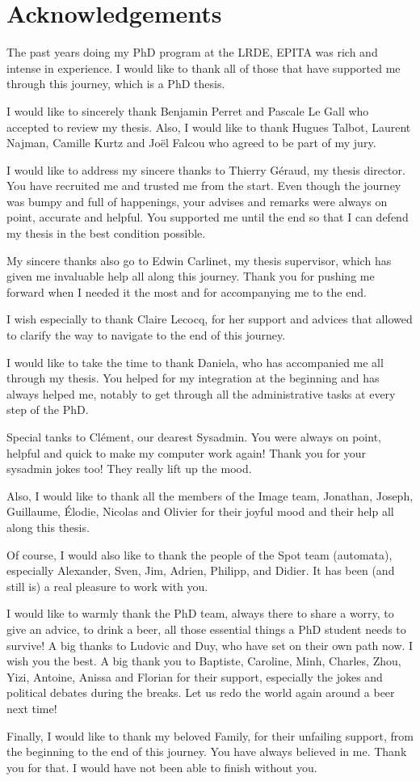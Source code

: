 \section*{Acknowledgements}
\label{sec:acknowledgement}

The past years doing my PhD program at the LRDE, EPITA was rich and intense in experience. I would like to thank all of
those that have supported me through this journey, which is a PhD thesis.

I would like to sincerely thank Benjamin Perret and Pascale Le Gall who accepted to review my thesis. Also, I would like
to thank Hugues Talbot, Laurent Najman, Camille Kurtz and Jo\"{e}l Falcou who agreed to be part of my jury.

I would like to address my sincere thanks to Thierry G\'{e}raud, my thesis director. You have recruited me and trusted
me from the start. Even though the journey was bumpy and full of happenings, your advises and remarks were always on
point, accurate and helpful. You supported me until the end so that I can defend my thesis in the best condition
possible.

My sincere thanks also go to Edwin Carlinet, my thesis supervisor, which has given me invaluable help all along this
journey. Thank you for pushing me forward when I needed it the most and for accompanying me to the end.

I wish especially to thank Claire Lecocq, for her support and advices that allowed to clarify the way to navigate to the
end of this journey.

I would like to take the time to thank Daniela, who has accompanied me all through my thesis. You helped for my
integration at the beginning and has always helped me, notably to get through all the administrative tasks at every step
of the PhD.

Special tanks to Cl\'{e}ment, our dearest Sysadmin. You were always on point, helpful and quick to make my computer work
again! Thank you for your sysadmin jokes too! They really lift up the mood.

Also, I would like to thank all the members of the Image team, Jonathan, Joseph, Guillaume, \'{E}lodie, Nicolas and
Olivier for their joyful mood and their help all along this thesis.

Of course, I would also like to thank the people of the Spot team (automata), especially Alexander, Sven, Jim, Adrien,
Philipp, and Didier. It has been (and still is) a real pleasure to work with you.

I would like to warmly thank the PhD team, always there to share a worry, to give an advice, to drink a beer, all those
essential things a PhD student needs to survive! A big thanks to Ludovic and Duy, who have set on their own path now. I
wish you the best. A big thank you to Baptiste, Caroline, Minh, Charles, Zhou, Yizi, Antoine, Anissa and Florian for
their support, especially the jokes and political debates during the breaks. Let us redo the world again around a beer
next time!

Finally, I would like to thank my beloved Family, for their unfailing support, from the beginning to the end of this
journey. You have always believed in me. Thank you for that. I would have not been able to finish without you.
